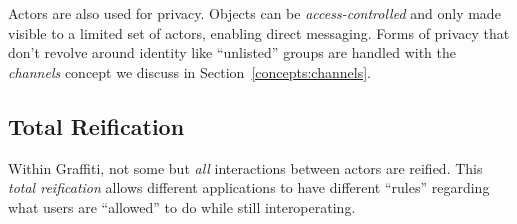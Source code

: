 Actors are also used for privacy.
Objects can be \emph{access-controlled} and only
made visible to a limited set of actors, enabling
direct messaging.
Forms of privacy that don't revolve around identity
like ``unlisted'' groups are handled
with the \emph{channels} concept we discuss in
Section~\ref{concepts:channels}.



\subsection{Total Reification}
\label{concepts:total-reification}

Within Graffiti, not some but \emph{all} interactions between actors
are reified.
This \emph{total reification} allows different applications to have
different ``rules'' regarding what users are ``allowed'' to do while
still interoperating.




